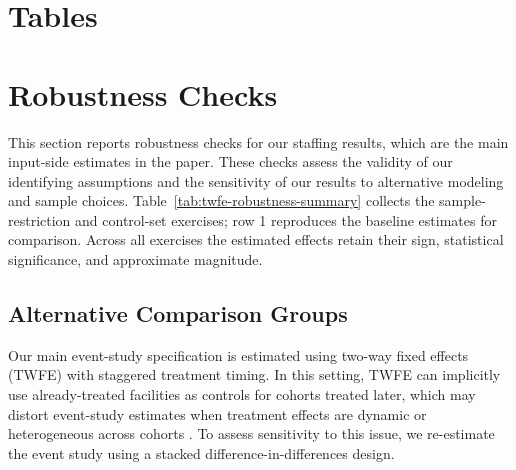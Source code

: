 \documentclass[12pt]{article}
\begin{document}
\singlespacing
\setlength\bibsep{0pt}



\clearpage

\onehalfspacing

\section*{Tables} \label{sec:tab}


\FloatBarrier

\FloatBarrier


\FloatBarrier


\FloatBarrier


\FloatBarrier


\FloatBarrier

\clearpage
\appendix
\section{Robustness Checks} \label{app:robustness}
This section reports robustness checks for our staffing results, which are the main input-side estimates in the paper. These checks assess the validity of our identifying assumptions and the sensitivity of our results to alternative modeling and sample choices. Table~\ref{tab:twfe-robustness-summary} collects the sample-restriction and control-set exercises; row 1 reproduces the baseline estimates for comparison. Across all exercises the estimated effects retain their sign, statistical significance, and approximate magnitude.

\subsection{Alternative Comparison Groups}

Our main event-study specification is estimated using two-way fixed effects (TWFE) with staggered treatment timing. In this setting, TWFE can implicitly use already-treated facilities as controls for cohorts treated later, which may distort event-study estimates when treatment effects are dynamic or heterogeneous across cohorts \citep{goodman_bacon_2021}. To assess sensitivity to this issue, we re-estimate the event study using a stacked difference-in-differences design.
\end{document}
